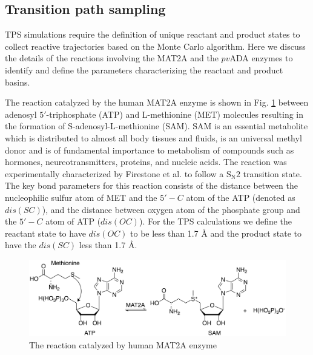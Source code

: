 \documentclass[journal=jpcbfk,manuscript=article,layout=traditional]{achemso}
\begin{document}
\subsection{Transition path sampling}
TPS simulations require the definition of unique reactant and product states
to collect reactive trajectories based on the Monte Carlo algorithm. Here we 
discuss the details of the reactions involving the MAT2A and the $pv$ADA enzymes 
to identify and define the parameters characterizing the reactant and product basins.  

The reaction catalyzed by the human MAT2A enzyme is shown in Fig. \ref{fig:mat2a-reaction}
between adenosyl $5'$-triphosphate (ATP) and L-methionine (MET) molecules resulting in the formation of
S-adenosyl-L-methionine (SAM). SAM is an essential metabolite which is distributed to almost all 
body tissues and fluids, is an universal methyl donor and is of
fundamental importance to metabolism of compounds such as hormones, neureotransmitters, proteins, 
and nucleic acids. \cite{Friedel89Drugs38p389} The reaction was experimentally characterized by 
Firestone et al. \cite{Firestone17JAmChemSoc139p13754} to follow a S$_{\text{N}}2$ transition 
state. The key bond parameters for this reaction consists of the distance between the
nucleophilic sulfur atom of MET and the $5'-C$ atom of the ATP (denoted as $dis(SC)$), and the distance between 
oxygen atom of the phosphate group and the $5'-C$ atom of ATP ($dis(OC)$).
For the TPS calculations we define the reactant state to have $dis(OC)$ to be 
less than 1.7 {\AA} and the product state to have the $dis(SC)$ less than 1.7 {\AA}. 

\begin{figure}
\includegraphics[scale=0.6]{figures/mat2a-reaction.png}
\caption{The reaction catalyzed by human MAT2A enzyme}
\label{fig:mat2a-reaction}
\end{figure}
\end{document}
